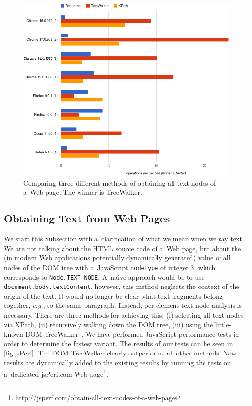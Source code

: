 \documentclass{sig-alternate}
\let\oldemph\emph
\renewcommand{\emph}[1]{\oldemph{\fontsize{9}{9}\selectfont #1}}
\newcommand{\inlinelistingsize}{\fontsize{8pt}{11pt}}
\let\oldurl\url
\renewcommand{\url}[1]{\inlinelistingsize\oldurl{#1}}
\begin{document}
\begin{figure}[t!]
\begin{center}
   \includegraphics[width=1\linewidth]{./jsPerf.png}
\end{center}
   \caption{Comparing three different methods of obtaining all text nodes of a~Web page. The winner is TreeWalker.}
\label{fig:jsPerf}
\end{figure}

\subsection{Obtaining Text from Web Pages}
We start this Subsection with a~clarification of what we mean when we say text.
We are not talking about the HTML source code of a~Web page,
but about the (in modern Web applications potentially dynamically generated) value of all nodes
of the DOM tree with a~JavaScript \texttt{nodeType} of integer $3$,
which corresponds to \texttt{Node.TEXT\_NODE}.
A~naive approach would be to use \texttt{document.body.textContent}, however,
this method neglects the context of the origin of the text.
It would no longer be clear what text fragments belong together, \emph{e.g.}, to the same paragraph.
Instead, per-element text node analysis is necessary.
There are three methods for achieving this:
(i) selecting all text nodes via XPath,
(ii) recursively walking down the DOM tree,
(iii) using the little-known DOM TreeWalker~\cite{treewalker}.
We have performed JavaScript performance tests in order to determine the fastest variant.
The results of our tests can be seen in \autoref{fig:jsPerf}.
The DOM TreeWalker clearly outperforms all other methods.
New results are dynamically added to the existing results by running the tests on a~dedicated \url{jsPerf.com} Web page\footnote{\url{http://jsperf.com/obtain-all-text-nodes-of-a-web-page}}.
\end{document}
